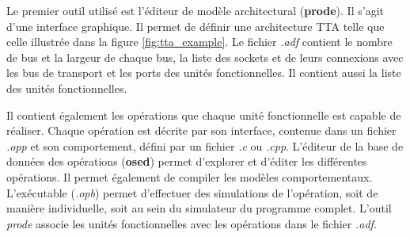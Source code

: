 Le premier outil utilisé est l'éditeur de modèle architectural (\textbf{prode}). Il s'agit d'une interface graphique. Il permet de définir une architecture TTA telle que celle illustrée dans la figure \ref{fig:tta_example}. Le fichier \textit{.adf} contient le nombre de bus et la largeur de chaque bus, la liste des sockets et de leurs connexions avec les bus de transport et les ports des unités fonctionnelles. Il contient aussi la liste des unités fonctionnelles.

Il contient également les opérations que chaque unité fonctionnelle est capable de réaliser. Chaque opération est décrite par son interface, contenue dans un fichier \textit{.opp} et son comportement, défini par un fichier \textit{.c} ou \textit{.cpp}. L'éditeur de la base de données des opérations (\textbf{osed}) permet d'explorer et d'éditer les différentes opérations. Il permet également de compiler les modèles comportementaux. L'exécutable (\textit{.opb}) permet d'effectuer des simulations de l'opération, soit de manière individuelle, soit au sein du simulateur du programme complet. L'outil \textit{prode} associe les unités fonctionnelles avec les opérations dans le fichier \textit{.adf}.

